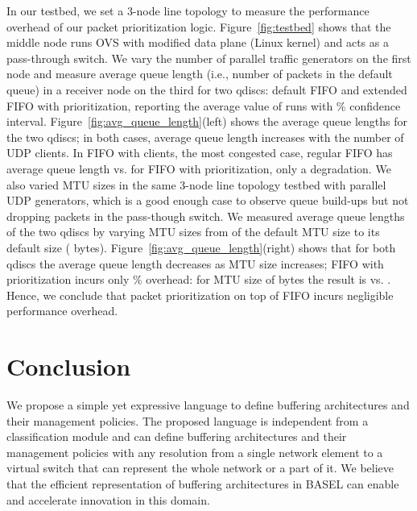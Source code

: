 \documentclass{article}
\newcommand{\barch}{BASEL}
\begin{document}
In our testbed, we set a 3-node line topology to measure the performance overhead of our packet prioritization logic. Figure~\ref{fig:testbed} shows that the middle node runs OVS with modified data plane
(Linux kernel) and acts as a pass-through switch. We vary the number of parallel traffic generators on the first node
and measure average queue length (i.e., number of packets in the default queue) in a receiver node on the third
for two qdiscs: default FIFO and extended FIFO with prioritization, reporting the average value of  runs with
\% confidence interval. Figure~\ref{fig:avg_queue_length}(left) shows the average queue lengths for the
two qdiscs; in both cases, average queue length increases with the number of UDP clients. In FIFO with  clients,
the most congested case, regular FIFO has average queue length  vs.  for FIFO with prioritization,
only a  degradation. 
We also varied MTU sizes in the same 3-node line topology testbed with  parallel UDP generators, which is a good enough case to observe queue build-ups but not dropping packets in the pass-though switch. We measured average queue lengths of the two qdiscs by varying MTU sizes from  of the default MTU size to its default size ( bytes). Figure~\ref{fig:avg_queue_length}(right) shows that for both qdiscs the average queue length decreases as MTU size increases; FIFO with prioritization incurs only \% overhead: for MTU size of  bytes the result is  vs. . Hence, we conclude that packet prioritization on top of FIFO incurs negligible performance overhead.





\begin{figure} 
\end{figure}
















\vspace{-5pt}
\section{Conclusion}\label{sec:conclusion}
We propose a simple yet expressive language to define buffering architectures and their management policies. The proposed language is independent from a classification module and can define buffering architectures and their management policies with any resolution from a single network element to a virtual switch that can represent the whole network or a part of it. We believe that the efficient representation of buffering architectures in \barch{} can enable and accelerate innovation in this domain.
\end{document}
